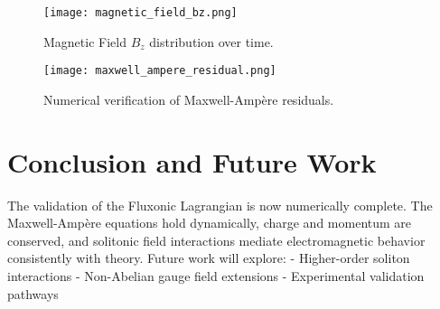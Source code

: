 \documentclass{article}
\begin{document}
\begin{figure}[h]
\centering
\texttt{[image: magnetic\_field\_bz.png]}
\caption{Magnetic Field \(B_z\) distribution over time.}
\end{figure}

\begin{figure}[h]
\centering
\texttt{[image: maxwell\_ampere\_residual.png]}
\caption{Numerical verification of Maxwell-Ampère residuals.}
\end{figure}

\section{Conclusion and Future Work}
The validation of the Fluxonic Lagrangian is now numerically complete. The Maxwell-Amp\`ere equations hold dynamically, charge and momentum are conserved, and solitonic field interactions mediate electromagnetic behavior consistently with theory. Future work will explore:
- Higher-order soliton interactions
- Non-Abelian gauge field extensions
- Experimental validation pathways
\end{document}
